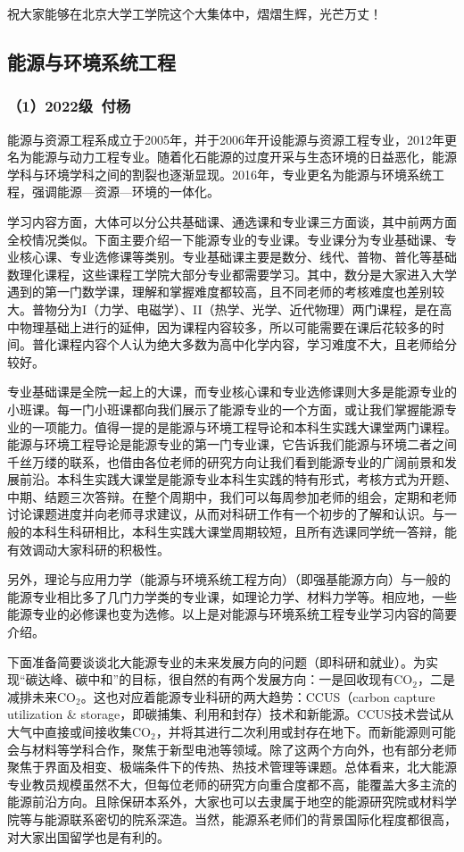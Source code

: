 \documentclass[11pt,oneside]{book}
\begin{document}
祝大家能够在北京大学工学院这个大集体中，熠熠生辉，光芒万丈！


\subsection{能源与环境系统工程}
\subsubsection{（1）2022级\ 付杨}
能源与资源工程系成立于2005年，并于2006年开设能源与资源工程专业，2012年更名为能源与动力工程专业。随着化石能源的过度开采与生态环境的日益恶化，能源学科与环境学科之间的割裂也逐渐显现。2016年，专业更名为能源与环境系统工程，强调能源—资源—环境的一体化。

学习内容方面，大体可以分公共基础课、通选课和专业课三方面谈，其中前两方面全校情况类似。下面主要介绍一下能源专业的专业课。专业课分为专业基础课、专业核心课、专业选修课等类别。专业基础课主要是数分、线代、普物、普化等基础数理化课程，这些课程工学院大部分专业都需要学习。其中，数分是大家进入大学遇到的第一门数学课，理解和掌握难度都较高，且不同老师的考核难度也差别较大。普物分为I（力学、电磁学）、II（热学、光学、近代物理）两门课程，是在高中物理基础上进行的延伸，因为课程内容较多，所以可能需要在课后花较多的时间。普化课程内容个人认为绝大多数为高中化学内容，学习难度不大，且老师给分较好。

专业基础课是全院一起上的大课，而专业核心课和专业选修课则大多是能源专业的小班课。每一门小班课都向我们展示了能源专业的一个方面，或让我们掌握能源专业的一项能力。值得一提的是能源与环境工程导论和本科生实践大课堂两门课程。能源与环境工程导论是能源专业的第一门专业课，它告诉我们能源与环境二者之间千丝万缕的联系，也借由各位老师的研究方向让我们看到能源专业的广阔前景和发展前沿。本科生实践大课堂是能源专业本科生实践的特有形式，考核方式为开题、中期、结题三次答辩。在整个周期中，我们可以每周参加老师的组会，定期和老师讨论课题进度并向老师寻求建议，从而对科研工作有一个初步的了解和认识。与一般的本科生科研相比，本科生实践大课堂周期较短，且所有选课同学统一答辩，能有效调动大家科研的积极性。

另外，理论与应用力学（能源与环境系统工程方向）（即强基能源方向）与一般的能源专业相比多了几门力学类的专业课，如理论力学、材料力学等。相应地，一些能源专业的必修课也变为选修。以上是对能源与环境系统工程专业学习内容的简要介绍。

下面准备简要谈谈北大能源专业的未来发展方向的问题（即科研和就业）。为实现“碳达峰、碳中和”的目标，很自然的有两个发展方向：一是回收现有CO$_2$，二是减排未来CO$_2$。这也对应着能源专业科研的两大趋势：CCUS（carbon capture utilization \& storage，即碳捕集、利用和封存）技术和新能源。CCUS技术尝试从大气中直接或间接收集CO$_2$，并将其进行二次利用或封存在地下。而新能源则可能会与材料等学科合作，聚焦于新型电池等领域。除了这两个方向外，也有部分老师聚焦于界面及相变、极端条件下的传热、热技术管理等课题。总体看来，北大能源专业教员规模虽然不大，但每位老师的研究方向重合度都不高，能覆盖大多主流的能源前沿方向。且除保研本系外，大家也可以去隶属于地空的能源研究院或材料学院等与能源联系密切的院系深造。当然，能源系老师们的背景国际化程度都很高，对大家出国留学也是有利的。
\end{document}
